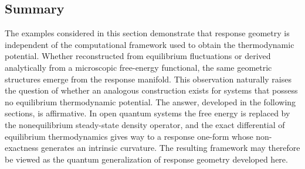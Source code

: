 \subsection{Summary}
The examples considered in this section demonstrate that response geometry is independent of the computational framework used to obtain the thermodynamic potential. Whether reconstructed from equilibrium fluctuations or derived analytically from a microscopic free-energy functional, the same geometric structures emerge from the response manifold. This observation naturally raises the question of whether an analogous construction exists for systems that possess no equilibrium thermodynamic potential. The answer, developed in the following sections, is affirmative. In open quantum systems the free energy is replaced by the nonequilibrium steady-state density operator, and the exact differential of equilibrium thermodynamics gives way to a response one-form whose non-exactness generates an intrinsic curvature. The resulting framework may therefore be viewed as the quantum generalization of response geometry developed here.



